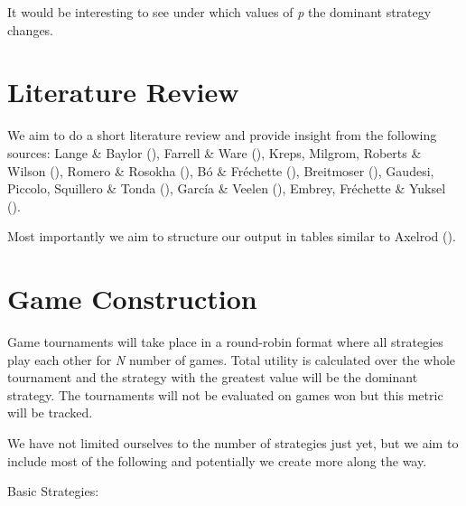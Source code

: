 \documentclass[11pt,preprint]{elsarticle}
\numberwithin{equation}{section}
\numberwithin{figure}{section}
\numberwithin{table}{section}
\begin{document}
It would be interesting to see under which values of \emph{p} the
dominant strategy changes.

\section{\texorpdfstring{Literature
Review\label{litreview}}{Literature Review}}\label{literature-review}

We aim to do a short literature review and provide insight from the
following sources: Lange \& Baylor
(), Farrell \& Ware
(), Kreps, Milgrom, Roberts
\& Wilson (), Romero \& Rosokha
(), Bó \& Fréchette
(), Breitmoser
(), Gaudesi, Piccolo,
Squillero \& Tonda (), García
\& Veelen (), Embrey, Fréchette \&
Yuksel ().

Most importantly we aim to structure our output in tables similar to
Axelrod ().

\section{Game Construction}\label{game-construction}

Game tournaments will take place in a round-robin format where all
strategies play each other for \emph{N} number of games. Total utility
is calculated over the whole tournament and the strategy with the
greatest value will be the dominant strategy. The tournaments will not
be evaluated on games won but this metric will be tracked.

We have not limited ourselves to the number of strategies just yet, but
we aim to include most of the following and potentially we create more
along the way.

Basic Strategies:
\end{document}
